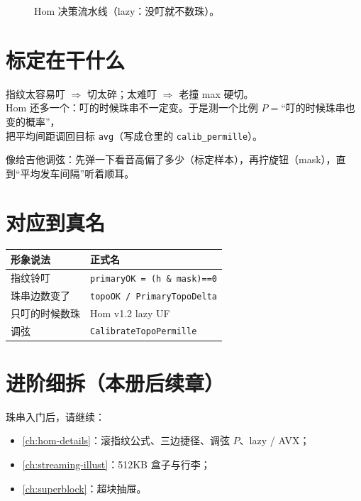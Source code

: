 \begin{figure}[htbp]
\centering
{}
\caption{Hom 决策流水线（lazy：没叮就不数珠）。}
\label{fig:hom-pipeline-illust}
\end{figure}

\section{标定在干什么}

指纹太容易叮 $\Rightarrow$ 切太碎；太难叮 $\Rightarrow$ 老撞 max 硬切。\\
Hom 还多一个：叮的时候珠串不一定变。于是测一个比例 $P=$``叮的时候珠串也变的概率''，\\
把平均间距调回目标 \texttt{avg}（写成仓里的 \texttt{calib\_permille}）。

\begin{metaphor}[调音]
像给吉他调弦：先弹一下看音高偏了多少（标定样本），再拧旋钮（mask），直到``平均发车间隔''听着顺耳。
\end{metaphor}

\section{对应到真名}

\begin{center}
\begin{tabular}{@{}ll@{}}
\toprule
形象说法 & 正式名 \\
\midrule
指纹铃叮 & \texttt{primaryOK = (h \& mask)==0} \\
珠串边数变了 & \texttt{topoOK / PrimaryTopoDelta} \\
只叮的时候数珠 & Hom v1.2 lazy UF \\
调弦 & \texttt{CalibrateTopoPermille} \\
\bottomrule
\end{tabular}
\end{center}

\section{进阶细拆（本册后续章）}

珠串入门后，请继续：
\begin{itemize}[nosep]
  \item \cref{ch:hom-details}：滚指纹公式、三边捷径、调弦 $P$、lazy / AVX；
  \item \cref{ch:streaming-illust}：512KB 盒子与行李；
  \item \cref{ch:superblock}：超块抽屉。
\end{itemize}

